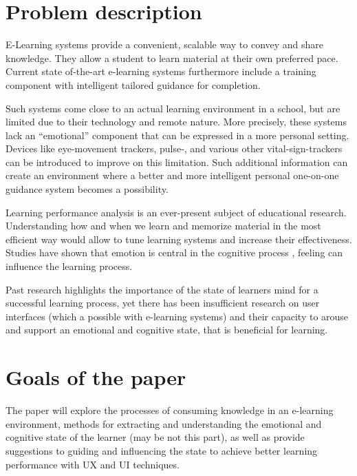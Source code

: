 \section {Problem description}

E-Learning systems provide a convenient, scalable way to convey and share knowledge. They allow a student to learn material at their own preferred pace. 
Current state of-the-art e-learning systems furthermore include a training component with intelligent tailored guidance for completion. 

Such systems come close to an actual learning environment in a school, but are limited due to their technology and remote nature. More precisely, these systems lack an “emotional” component that can be expressed in a more personal setting. Devices like eye-movement trackers, pulse-, and various other vital-sign-trackers can be introduced to improve on this limitation. Such additional information can create an environment where a better and more intelligent personal one-on-one guidance system becomes a possibility.

Learning performance analysis is an ever-present subject of educational research. Understanding how and when we learn and memorize material in the most efficient way would allow to tune learning systems and increase their effectiveness. Studies have shown that emotion is central in the cognitive process \cite{ORegan2003}, feeling can influence the learning process. \cite{Hawkins2017} 

Past research highlights the importance of the state of learners mind for a successful learning process, yet there has been insufficient research on user interfaces (which a possible with e-learning systems) and their capacity to arouse and support an emotional and cognitive state, that is beneficial for learning.


\section{Goals of the paper}

The paper will explore the processes of consuming knowledge in an e-learning environment, methods for extracting and understanding the emotional and cognitive state of the learner (may be not this part), as well as provide suggestions to guiding and influencing the state to achieve better learning performance with UX and UI techniques.

